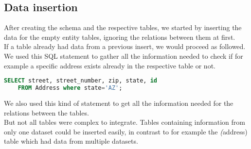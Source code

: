 \subsection*{Data insertion}
After creating the schema and the respective tables, we started by inserting the data for the empty entity tables, ignoring the relations between them at first.\\
If a table already had data from a previous insert, we would proceed as followed. We used this SQL statement to gather all the information needed to check if for example a specific address exists already in the respective table or not.
\begin{lstlisting}[language=SQL]
    SELECT street, street_number, zip, state, id 
    FROM Address where state='AZ';
\end{lstlisting}
We also used this kind of statement to get all the information needed for the relations between the tables.\\
But not all tables were complex to integrate. Tables containing information from only one dataset could be inserted easily, in contrast to for example the \textit(address) table which had data from multiple datasets.

